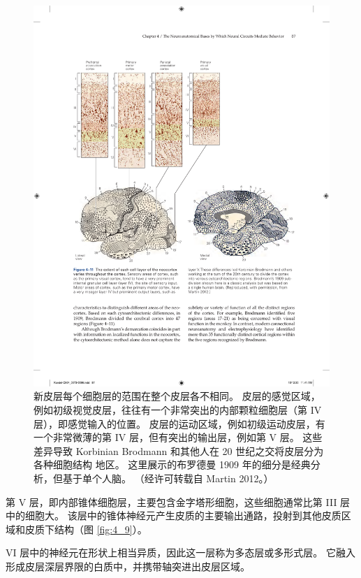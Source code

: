 \begin{figure}[htbp]
	\centering
	\includegraphics[width=1.0\linewidth]{chap04/fig_4_11}
	\caption{新皮层每个细胞层的范围在整个皮层各不相同。 
		皮层的感觉区域，例如初级视觉皮层，往往有一个非常突出的内部颗粒细胞层（第 IV 层），即感觉输入的位置。 
		皮层的运动区域，例如初级运动皮层，有一个非常微薄的第 IV 层，但有突出的输出层，例如第 V 层。
		这些差异导致 Korbinian Brodmann 和其他人在 20 世纪之交将皮层分为各种细胞结构 地区。 
		这里展示的布罗德曼 1909 年的细分是经典分析，但基于单个人脑。 （经许可转载自 Martin 2012。）}
	\label{fig:4_11}
\end{figure}


第 V 层，即内部锥体细胞层，主要包含金字塔形细胞，这些细胞通常比第 III 层中的细胞大。 
该层中的锥体神经元产生皮质的主要输出通路，投射到其他皮质区域和皮质下结构（图 \ref{fig:4_9}）。


VI 层中的神经元在形状上相当异质，因此这一层称为多态层或多形式层。 
它融入形成皮层深层界限的白质中，并携带轴突进出皮层区域。


